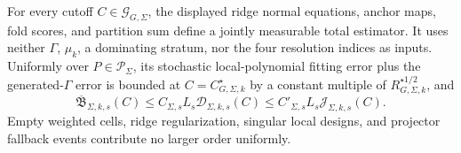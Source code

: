 For every cutoff \(C\in\mathcal G_{G,\Sigma}\), the displayed ridge normal equations, anchor maps, fold scores, and partition sum define a jointly measurable total estimator. It uses neither \(\Gamma\), \(\mu_k\), a dominating stratum, nor the four resolution indices as inputs. Uniformly over \(P\in\mathcal P_\Sigma\), its stochastic local-polynomial fitting error plus the generated-\(\Gamma\) error is bounded at \(C=C_{G,\Sigma,k}^{\star}\) by a constant multiple of \(R_{G,\Sigma,k}^{\star 1/2}\), and \[\overline{\mathfrak B}_{\Sigma,k,s}(C)\le C_{\Sigma,s}L_s\mathcal D_{\Sigma,k,s}(C)\le C'_{\Sigma,s}L_s\mathcal J_{\Sigma,k,s}(C).\] Empty weighted cells, ridge regularization, singular local designs, and projector fallback events contribute no larger order uniformly.